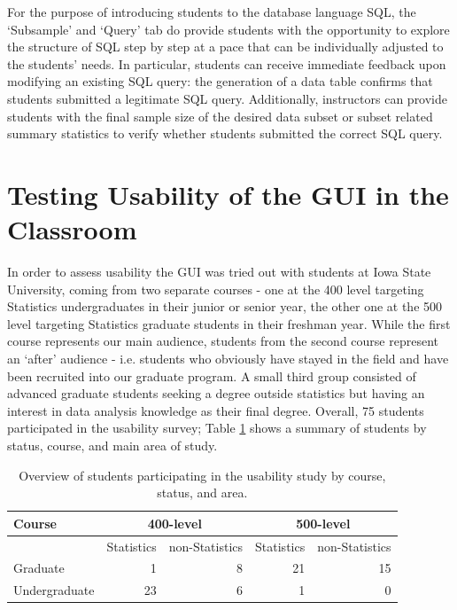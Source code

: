 \documentclass[11pt]{tise_style}
\begin{document}
For the purpose of introducing students to the database language SQL, the `Subsample' and `Query' tab do provide students with the opportunity to explore the structure of SQL step by step at a pace that can be individually adjusted to the students' needs. In particular, students can receive immediate feedback upon modifying an existing SQL query: the generation of a data table confirms that students submitted a legitimate SQL query. Additionally, instructors can provide students with the final sample size of the desired data subset or subset related summary statistics to verify whether students submitted the correct SQL query.


\section{Testing Usability of the GUI in the Classroom}
\label{implement}
In order to assess usability the GUI was tried out with students at Iowa State University, coming from two separate courses - one at the 400 level targeting Statistics undergraduates in their junior or senior year, the other one at the 500 level targeting Statistics graduate students in their freshman year. While the first course represents  our main audience, students from the second course represent an `after' audience - i.e. students who obviously have stayed in the field and have been recruited into our graduate program.  A small third group consisted of advanced graduate students seeking a degree outside statistics but having an interest in data analysis knowledge as their final degree.  Overall, 75 students participated in the usability survey; Table \ref{fb-overview} shows a summary of students by status, course, and main area of study. 

\begin{table}[htbp]
   \centering
   \begin{tabular}{lrrrr} %
      \toprule
	Course  & \multicolumn{2}{c}{400-level} & \multicolumn{2}{c}{500-level} \\
      \midrule
      & Statistics & non-Statistics       & Statistics & non-Statistics \\
       \cmidrule(l){2-5}
      Graduate & 1 & 8 & 21 & 15 \\
      Undergraduate & 23 & 6 & 1 & 0 \\
      \bottomrule
   \end{tabular}
   \caption{Overview of students participating in the usability study by course, status, and area.}
   \label{fb-overview}
\end{table}
\end{document}

